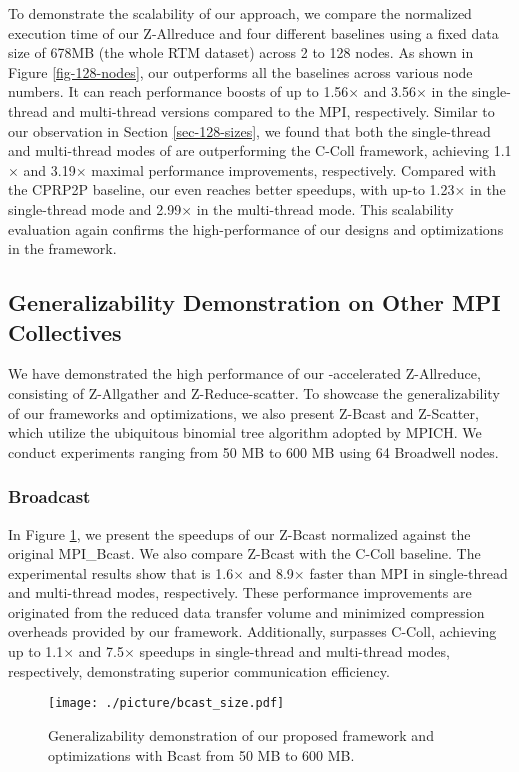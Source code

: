 To demonstrate the scalability of our approach, we compare the normalized execution time of our Z-Allreduce and four different baselines using a fixed data size of 678MB (the whole RTM dataset) across 2 to 128 nodes. As shown in Figure \ref{fig-128-nodes}, our {\pname} outperforms all the baselines across various node numbers. It can reach performance boosts of up to 1.56$\times$ and 3.56$\times$ in the single-thread and multi-thread versions compared to the MPI, respectively. Similar to our observation in Section \ref{sec-128-sizes}, we found that both the single-thread and multi-thread modes of {\pname} are outperforming the C-Coll framework, achieving 1.1$\times$ and 3.19$\times$ maximal performance improvements, respectively. Compared with the CPRP2P baseline, our {\pname} even reaches better speedups, with up-to 1.23$\times$ in the single-thread mode and 2.99$\times$ in the multi-thread mode. This scalability evaluation again confirms the high-performance of our designs and optimizations in the {\pname} framework.




\subsection{Generalizability Demonstration on Other MPI Collectives}


We have demonstrated the high performance of our {\pname}-accelerated Z-Allreduce, consisting of Z-Allgather and Z-Reduce-scatter. To showcase the generalizability of our frameworks and optimizations, we also present Z-Bcast and Z-Scatter, which utilize the ubiquitous binomial tree algorithm adopted by MPICH. We conduct experiments ranging from 50 MB to 600 MB using 64 Broadwell nodes.
\subsubsection{Broadcast}\label{sec-eval-bcast}

In Figure \ref{fig-portability-bcast}, we present the speedups of our Z-Bcast normalized against the original MPI\_Bcast. We also compare Z-Bcast with the C-Coll baseline. The experimental results show that {\pname} is 1.6$\times$ and 8.9$\times$ faster than MPI in single-thread and multi-thread modes, respectively. These performance improvements are originated from the reduced data transfer volume and minimized compression overheads provided by our framework. Additionally, {\pname} surpasses C-Coll, achieving up to 1.1$\times$ and 7.5$\times$ speedups in single-thread and multi-thread modes, respectively, demonstrating superior communication efficiency.
\begin{figure}[ht]
    \centering
    {\texttt{[image: ./picture/bcast\_size.pdf]}}
    \caption{Generalizability demonstration of our proposed framework and optimizations with Bcast from 50 MB to 600 MB.} 
    \label{fig-portability-bcast}
\end{figure}
